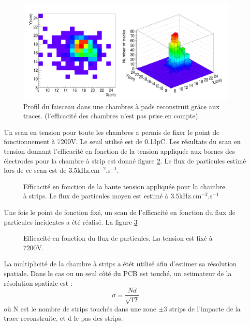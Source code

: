 \begin{figure}
	\centering
	\includegraphics[width=0.8\linewidth]{GLA/FaisceauPS.png}
	\caption{Profil du faisceau dans une chambres à pads reconstruit grâce aux traces. (l'efficacité des chambres n'est pas prise en compte).}
	\label{faisceauPS}
\end{figure}

Un scan en tension pour toute les chambres a permis de fixer le point de fonctionnement à 7200V. Le seuil utilisé est de 0.13pC. Les résultats du scan en tension donnant l'efficacité en fonction de la tension appliquée aux bornes des électrodes pour la chambre à strip est donné figure \ref{ScanTensionPS}. Le flux de particules estimé lors de ce scan est de $3.5$kHz.cm$^{-2}$.s$^{-1}$.

\begin{figure}[!ht]
	\centering
	\scalebox{1.4}{}
	\caption{Efficacité en fonction de la haute tension appliquée pour la chambre à strips. Le flux de particules moyen est estimé à $3.5$kHz.cm$^{-2}$.s$^{-1}$}
	\label{ScanTensionPS}
\end{figure}

Une fois le point de fonction fixé, un scan de l'efficacité en fonction du flux de particules incidentes a été réalisé. La figure \ref{ScanRatePS}

\begin{figure}[!ht]
	\centering
	\scalebox{1.4}{}
	\caption{Efficacité en fonction du flux de particules. La tension est fixé à 7200V.}
	\label{ScanRatePS}
\end{figure}

La multiplicité de la chambre à strips a étét utilisé afin d'estimer sa résolution spatiale. Dans le cas ou un seul côté du PCB est touché, un estimateur de la résolution spatiale est :
\begin{equation}
\sigma=\frac{Nd}{\sqrt{12}}
\end{equation}
où N est le nombre de strips touchés dans une zone $\pm 3$ strips de l'impacte de la trace reconstruite, et d le pas des strips.

